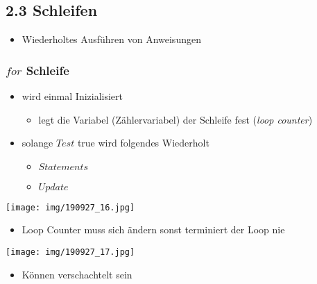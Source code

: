 \documentclass[11pt]{article}
\begin{document}
\subsection{2.3 Schleifen}
\label{sec:orgb9618c5}
\begin{itemize}
\item Wiederholtes Ausführen von Anweisungen\\
\end{itemize}

\subsubsection{\(for\) Schleife}
\label{sec:orgcab001c}
\begin{itemize}
\item wird einmal Inizialisiert\\
\begin{itemize}
\item legt die Variabel (Zählervariabel) der Schleife fest (\emph{loop counter})\\
\end{itemize}
\item solange \(Test\) true wird folgendes Wiederholt\\
\begin{itemize}
\item \(Statements\)\\
\item \(Update\)\\
\end{itemize}
\end{itemize}
\begin{center}
\texttt{[image: img/190927\_16.jpg]}
\end{center}

\begin{itemize}
\item Loop Counter muss sich ändern sonst terminiert der Loop nie\\
\end{itemize}
\begin{center}
\texttt{[image: img/190927\_17.jpg]}
\end{center}

\begin{itemize}
\item Können verschachtelt sein\\
\end{itemize}
\end{document}
